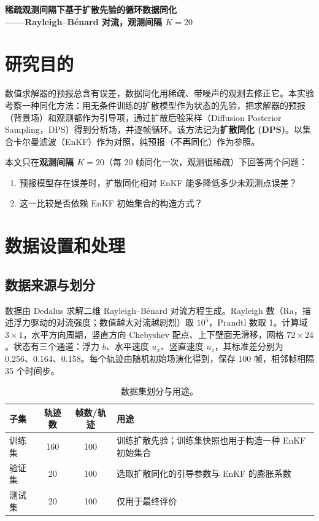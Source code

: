 \documentclass[10.5pt,a4paper]{article}
\begin{document}
\begin{center}{\LARGE\bfseries 稀疏观测间隔下基于扩散先验的循环数据同化\\\large ——Rayleigh--B\'enard 对流，观测间隔 $K=20$\par}\end{center}

\section{研究目的}
数值求解器的预报总含有误差，数据同化用稀疏、带噪声的观测去修正它。本实验考察一种同化方法：用无条件训练的扩散模型作为状态的先验，把求解器的预报（背景场）和观测都作为引导项，通过扩散后验采样（Diffusion Posterior Sampling，DPS）得到分析场，并逐帧循环。该方法记为\textbf{扩散同化 (DPS)}。以集合卡尔曼滤波（EnKF）作为对照，纯预报（不再同化）作为参照。

本文只在\textbf{观测间隔 $K=20$}（每 20 帧同化一次，观测很稀疏）下回答两个问题：
\begin{enumerate}
\item 预报模型存在误差时，扩散同化相对 EnKF 能多降低多少未观测点误差？
\item 这一比较是否依赖 EnKF 初始集合的构造方式？
\end{enumerate}

\section{数据设置和处理}
\subsection{数据来源与划分}
数据由 Dedalus 求解二维 Rayleigh--B\'enard 对流方程生成。Rayleigh 数（Ra，描述浮力驱动的对流强度；数值越大对流越剧烈）取 $10^5$，Prandtl 数取 1。计算域 $3\times1$，水平方向周期，竖直方向 Chebyshev 配点、上下壁面无滑移，网格 $72\times24$。状态有三个通道：浮力 $b$、水平速度 $u_x$、竖直速度 $u_z$，其标准差分别为 0.256、0.164、0.158。每个轨迹由随机初始场演化得到，保存 100 帧，相邻帧相隔 35 个时间步。

\begin{table}[H]\centering\small\caption{数据集划分与用途。}
\begin{tabular}{lccp{7.2cm}}\toprule
子集 & 轨迹数 & 帧数/轨迹 & 用途\\\midrule
训练集 & 160 & 100 & 训练扩散先验；训练集快照也用于构造一种 EnKF 初始集合\\
验证集 & 20 & 100 & 选取扩散同化的引导参数与 EnKF 的膨胀系数\\
测试集 & 20 & 100 & 仅用于最终评价\\\bottomrule
\end{tabular}\end{table}
\end{document}
